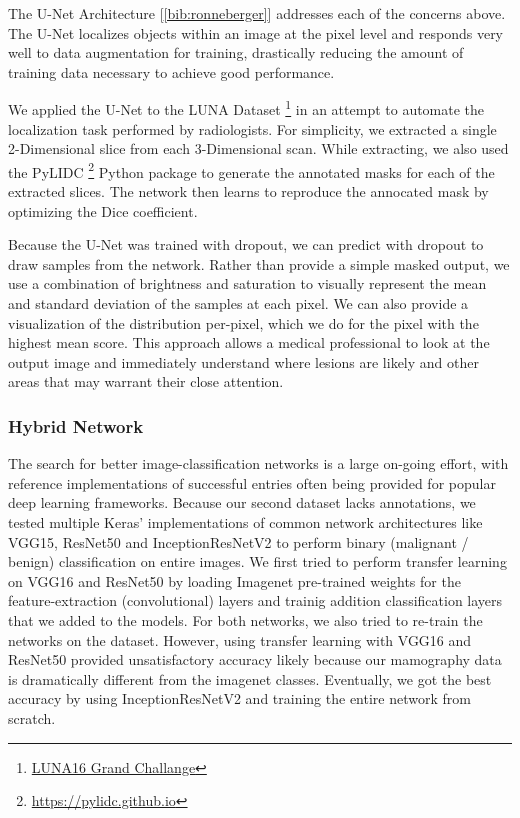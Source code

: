 \documentclass[12pt]{article}
\begin{document}
{The U-Net Architecture [\ref{bib:ronneberger}] addresses each of the concerns above. The U-Net localizes objects within an image at the pixel level and responds very well to data augmentation for training, drastically reducing the amount of training data necessary to achieve good performance.

We applied the U-Net to the LUNA Dataset \footnote{\href{http://luna16.grand-challenge.org}{LUNA16 Grand Challange}} in an attempt to automate the localization task performed by radiologists. For simplicity, we extracted a single 2-Dimensional slice from each 3-Dimensional scan. While extracting, we also used the PyLIDC \footnote{\href{https://pylidc.github.io}{https://pylidc.github.io}} Python package to generate the annotated masks for each of the extracted slices. The network then learns to reproduce the annocated mask by optimizing the Dice coefficient.

Because the U-Net was trained with dropout, we can predict with dropout to draw samples from the network. Rather than provide a simple masked output, we use a combination of brightness and saturation to visually represent the mean and standard deviation of the samples at each pixel. We can also provide a visualization of the distribution per-pixel, which we do for the pixel with the highest mean score. This approach allows a medical professional to look at the output image and immediately understand where lesions are likely and other areas that may warrant their close attention.

\subsubsection*{Hybrid Network}
The search for better image-classification networks is a large on-going effort, with reference implementations of successful entries often being provided for popular deep learning frameworks. Because our second dataset lacks annotations, we tested multiple Keras' implementations of common network architectures like VGG15, ResNet50 and InceptionResNetV2 to perform binary (malignant / benign) classification on entire images. We first tried to perform transfer learning on VGG16 and ResNet50 by loading Imagenet pre-trained weights for the feature-extraction (convolutional) layers and trainig addition classification layers that we added to the models. For both networks, we also tried to re-train the networks on the dataset. However, using transfer learning with VGG16 and ResNet50 provided unsatisfactory accuracy likely because our mamography data is dramatically different from the imagenet classes. Eventually, we got the best accuracy by using InceptionResNetV2 and training the entire network from scratch.

}
\end{document}
